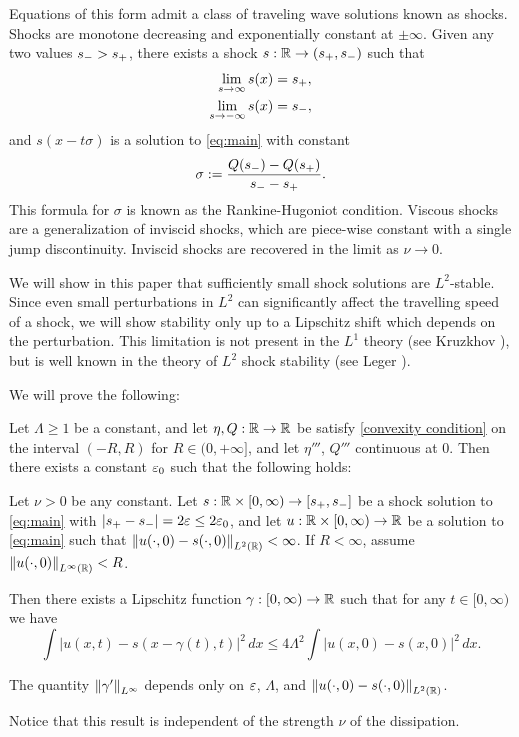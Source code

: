 Equations of this form admit a class of traveling wave solutions known as shocks.  Shocks are monotone decreasing and exponentially constant at $\pm \infty$.  Given any two values $s_- > s_+$, there exists a shock $s:\mathbb{R} \to (s_+, s_-)$ such that
\begin{align*}
\lim_{s \to \infty} s(x) &= s_+, \\
\lim_{s \to -\infty} s(x) &= s_-,
\end{align*}
and $s(x-t \sigma)$ is a solution to \eqref{eq:main} with constant
\[ \sigma := \frac{Q(s_-) - Q(s_+)}{s_- - s_+}. \]
This formula for $\sigma$ is known as the Rankine-Hugoniot condition.  Viscous shocks are a generalization of inviscid shocks, which are piece-wise constant with a single jump discontinuity.  Inviscid shocks are recovered in the limit as $\nu \to 0$.  

We will show in this paper that sufficiently small shock solutions are $L^2$-stable.  Since even small perturbations in $L^2$ can significantly affect the travelling speed of a shock, we will show stability only up to a Lipschitz shift which depends on the perturbation.  This limitation is not present in the $L^1$ theory (see Kruzkhov \cite{Kr.entropy}), but is well known in the theory of $L^2$ shock stability (see Leger \cite{Le}).  

We will prove the following:
\begin{theorem} \label{thm:main simple}
Let $\Lambda \geq 1$ be a constant, and let $\eta, Q: \mathbb{R} \to \mathbb{R}$ be satisfy \eqref{convexity condition} on the interval $(-R,R)$ for $R \in (0,+\infty]$, and let $\eta'''$, $Q'''$ continuous at 0.  Then there exists a constant $\varepsilon_0$ such that the following holds:

Let $\nu > 0$ be any constant.  Let $s: \mathbb{R} \times [0,\infty) \to [s_+,s_-]$ be a shock solution to \eqref{eq:main} with $|s_+ - s_-| = 2\varepsilon \leq 2\varepsilon_0$, and let $u:\mathbb{R}\times[0,\infty)\to\mathbb{R}$ be a solution to \eqref{eq:main} such that $\left\lVert u(\cdot,0) - s(\cdot,0)\right\rVert_{L^2(\mathbb{R})} < \infty$.  If $R < \infty$, assume $\left\lVert u(\cdot,0)\right\rVert_{L^\infty(\mathbb{R})} < R$.  

Then there exists a Lipschitz function $\gamma:[0,\infty) \to \mathbb{R}$ such that for any $t \in [0,\infty)$ we have
\[ \int |u(x,t) - s(x-\gamma(t),t)|^2 \,dx \leq 4\Lambda^2 \int |u(x,0) - s(x,0)|^2 \,dx. \]

The quantity $\left\lVert\gamma'\right\rVert_{L^\infty}$ depends only on $\varepsilon$, $\Lambda$, and $\left\lVert u(\cdot,0) - s(\cdot,0)\right\rVert_{L^2(\mathbb{R})}$.
\end{theorem}
Notice that this result is independent of the strength $\nu$ of the dissipation.  

